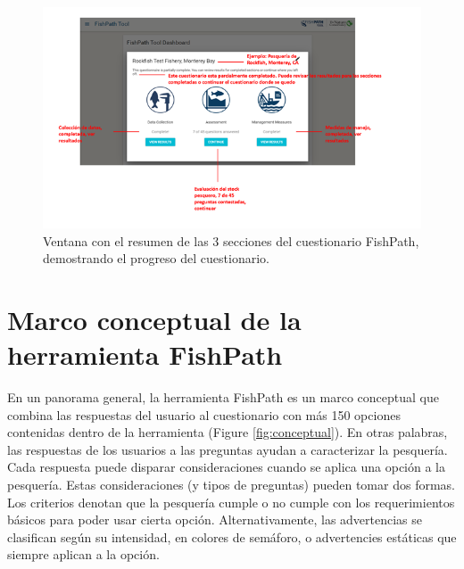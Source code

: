 \documentclass[
  11pt,
]{book}
\begin{document}
\begin{figure}
 
 {\centering \includegraphics[width=0.95\linewidth]{images/summary-screen-es} 
 
 }
 
 \caption{Ventana con el resumen de las 3 secciones del cuestionario FishPath, demostrando el progreso del cuestionario.}\label{fig:summary-screen}
 \end{figure}

\hypertarget{marco-conceptual-de-la-herramienta-fishpath}{%
\section{Marco conceptual de la herramienta FishPath}\label{marco-conceptual-de-la-herramienta-fishpath}}

En un panorama general, la herramienta FishPath es un marco conceptual que combina las respuestas del usuario al cuestionario con más 150 opciones contenidas dentro de la herramienta (Figure \ref{fig:conceptual}). En otras palabras, las respuestas de los usuarios a las preguntas ayudan a caracterizar la pesquería. Cada respuesta puede disparar consideraciones cuando se aplica una opción a la pesquería. Estas consideraciones (y tipos de preguntas) pueden tomar dos formas. Los criterios denotan que la pesquería cumple o no cumple con los requerimientos básicos para poder usar cierta opción. Alternativamente, las advertencias se clasifican según su intensidad, en colores de semáforo, o advertencies estáticas que siempre aplican a la opción.
\end{document}
